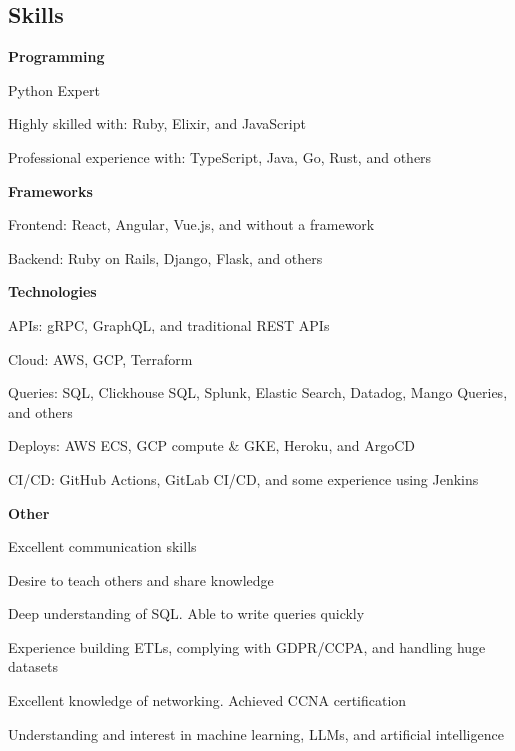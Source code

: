 \documentclass[margin,line]{resume}
\begin{document}
\begin{resume}
    \section{\mysidestyle \textbf{\large{S}\small{kills}}}
    \hspace{2.4mm}\textbf{Programming}\vspace{1mm}
    \begin{list2}
        \item Python Expert
        \item Highly skilled with: Ruby, Elixir, and JavaScript
        \item Professional experience with: TypeScript, Java, Go, Rust, and others
    \end{list2}\vspace{-1.5mm}

    \hspace{2.4mm}\textbf{Frameworks}\vspace{1mm}
    \begin{list2}
        \item Frontend: React, Angular, Vue.js, and without a framework
        \item Backend: Ruby on Rails, Django, Flask, and others
    \end{list2}\vspace{-1.5mm}

    \hspace{2.4mm}\textbf{Technologies}\vspace{1mm}
    \begin{list2}
        \item APIs: gRPC, GraphQL, and traditional REST APIs
        \item Cloud: AWS, GCP, Terraform
        \item Queries: SQL, Clickhouse SQL, Splunk, Elastic Search, Datadog, Mango Queries, and others
        \item Deploys: AWS ECS, GCP compute \& GKE, Heroku, and ArgoCD
        \item CI/CD: GitHub Actions, GitLab CI/CD, and some experience using Jenkins
    \end{list2}\vspace{-1.5mm}

    \hspace{2.4mm}\textbf{Other}\vspace{1mm}
    \begin{list2}
        \item Excellent communication skills
        \item Desire to teach others and share knowledge
        \item Deep understanding of SQL. Able to write queries quickly
        \item Experience building ETLs, complying with GDPR/CCPA, and handling huge datasets
        \item Excellent knowledge of networking. Achieved CCNA certification
        \item Understanding and interest in machine learning, LLMs, and artificial intelligence
    \end{list2}\vspace{-1.5mm}


\end{resume}
\end{document}
